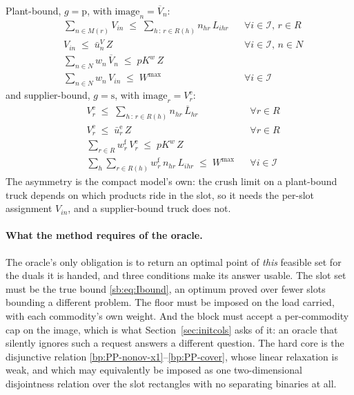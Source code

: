 Plant-bound, $g=\mathrm{p}$, with $\mathrm{image}_{n}=\overline{V}_{n}$:
\begin{align}
  & \sum_{n \in M(r)} V_{in} \;\le\; \sum_{h\,:\,r \in R(h)} n_{hr}\,L_{ihr}
    && \forall i \in \mathcal{I},\, r \in R \label{bp:PP-p-slot-cap}\\
  & V_{in} \;\le\; \bar u^{V}_{n}\,Z
    && \forall i \in \mathcal{I},\, n \in N \label{bp:PP-p-slot-link}\\
  & \sum_{n \in N} w_{n}\,\overline{V}_{n} \;\le\; \mathit{pK}^{w}\,Z
    \label{bp:PP-p-truck-w}\\
  & \sum_{n \in N} w_{n}\,V_{in} \;\le\; W^{\max}
    && \forall i \in \mathcal{I} \label{bp:PP-p-stack-w}
\end{align}
and supplier-bound, $g=\mathrm{s}$, with
$\mathrm{image}_{r}=V^{\mathrm{e}}_{r}$:
\begin{align}
  & V^{\mathrm{e}}_{r} \;\le\; \sum_{h\,:\,r \in R(h)} n_{hr}\,\overline{L}_{hr}
    && \forall r \in R \label{bp:PP-s-empty-cap}\\
  & V^{\mathrm{e}}_{r} \;\le\; \bar u^{\mathrm{e}}_{r}\,Z
    && \forall r \in R \label{bp:PP-s-empty-link}\\
  & \sum_{r \in R} w^{\mathrm{f}}_{r}\,V^{\mathrm{e}}_{r}
      \;\le\; \mathit{pK}^{w}\,Z \label{bp:PP-s-truck-w}\\
  & \sum_{h}\sum_{r \in R(h)} w^{\mathrm{f}}_{r}\,n_{hr}\,L_{ihr}
      \;\le\; W^{\max}
    && \forall i \in \mathcal{I} \label{bp:PP-s-stack-w}
\end{align}
The asymmetry is the compact model's own: the crush limit on a
plant-bound truck depends on which products ride in the slot, so it
needs the per-slot assignment $V_{in}$, and a supplier-bound truck does
not.

\paragraph{What the method requires of the oracle.}
The oracle's only obligation is to return an optimal point of
\emph{this} feasible set for the duals it is handed, and three
conditions make its answer usable. The slot set must be the true bound
\eqref{sb:eq:Ibound}, an optimum proved over fewer slots bounding a
different problem. The floor must be imposed on the load carried, with
each commodity's own weight. And the block must accept a per-commodity
cap on the image, which is what Section~\ref{sec:initcols} asks of
it: an oracle
that silently ignores such a request answers a different question. The
hard core is the disjunctive relation
\eqref{bp:PP-nonov-x1}--\eqref{bp:PP-cover}, whose linear relaxation
is weak, and which may equivalently be imposed as one two-dimensional
disjointness relation over the slot rectangles with no separating
binaries at all.

